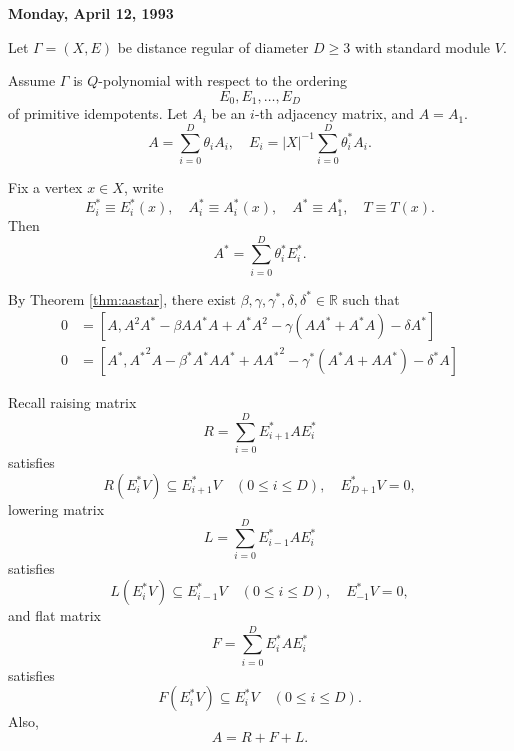 \documentclass[
]{book}
\theoremstyle{definition}
\theoremstyle{definition}
\theoremstyle{definition}
\theoremstyle{definition}
\theoremstyle{remark}
\begin{document}
\textbf{Monday, April 12, 1993}

Let \(\Gamma = (X, E)\) be distance regular of diameter \(D\geq 3\) with standard module \(V\).

Assume \(\Gamma\) is \(Q\)-polynomial with respect to the ordering
\[E_0, E_1, \ldots, E_D\]
of primitive idempotents. Let \(A_i\) be an \(i\)-th adjacency matrix, and \(A = A_1\).
\[A = \sum_{i=0}^D\theta_i A_i, \quad E_i = |X|^{-1}\sum_{i=0}^D\theta^*_i A_i.\]

Fix a vertex \(x\in X\), write
\[E^*_i \equiv E^*_i(x), \quad A^*_i\equiv A^*_i(x), \quad A^* \equiv A^*_1, \quad T\equiv T(x).\]
Then
\[A^* = \sum_{i=0}^D \theta^*_i E^*_i.\]

By Theorem \ref{thm:aastar}, there exist \(\beta, \gamma, \gamma^*, \delta, \delta^*\in \mathbb{R}\) such that
\begin{align}
0 & = [A, A^2A^*-\beta AA^*A + A^*A^2 - \gamma(AA^*+A^*A) - \delta A^*]\\
0 & = [A^*, {A^*}^2A-\beta^* A^*AA^* + A{A^*}^2 - \gamma^*(A^*A+AA^*) - \delta^* A]
\end{align}

Recall raising matrix
\[R = \sum_{i=0}^D E^*_{i+1}AE^*_i\]
satisfies
\[R(E^*_iV) \subseteq E^*_{i+1}V \quad (0\leq i\leq D), \quad E^*_{D+1}V = 0,\]
lowering matrix
\[L = \sum_{i=0}^D E^*_{i-1}AE^*_i\]
satisfies
\[L(E^*_iV) \subseteq E^*_{i-1}V \quad (0\leq i\leq D), \quad E^*_{-1}V = 0,\]
and flat matrix
\[F = \sum_{i=0}^D E^*_{i}AE^*_i\]
satisfies
\[F(E^*_iV) \subseteq E^*_{i}V \quad (0\leq i\leq D).\]
Also,
\[A = R + F + L.\]
\end{document}
